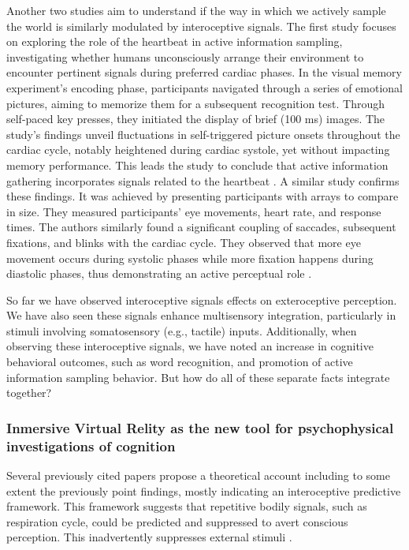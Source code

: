 \documentclass[12pt,oneside,openright]{report}
\begin{document}
Another two studies aim to understand if the way in which we actively sample the world is similarly modulated by interoceptive signals. The first study focuses on exploring the role of the heartbeat in active information sampling, investigating whether humans unconsciously arrange their environment to encounter pertinent signals during preferred cardiac phases. In the visual memory experiment's encoding phase, participants navigated through a series of emotional pictures, aiming to memorize them for a subsequent recognition test. Through self-paced key presses, they initiated the display of brief (100 ms) images. The study's findings unveil fluctuations in self-triggered picture onsets throughout the cardiac cycle, notably heightened during cardiac systole, yet without impacting memory performance. This leads the study to conclude that active information gathering incorporates signals related to the heartbeat \parencite{Kunzendorf2019-vz}. A similar study confirms these findings. It was achieved by presenting participants with arrays to compare in size. They measured participants' eye movements, heart rate, and response times. The authors similarly found a significant coupling of saccades, subsequent fixations, and blinks with the cardiac cycle. They observed that more eye movement occurs during systolic phases while more fixation happens during diastolic phases, thus demonstrating an active perceptual role \parencite{GalvezPol2018ActiveSI}.

So far we have observed interoceptive signals effects on exteroceptive perception. We have also seen these signals enhance multisensory integration, particularly in stimuli involving somatosensory (e.g., tactile) inputs. Additionally, when observing these interoceptive signals, we have noted an increase in cognitive behavioral outcomes, such as word recognition, and promotion of active information sampling behavior. But how do all of these separate facts integrate together?

\subsubsection*{Inmersive Virtual Relity as the new tool for psychophysical investigations of cognition}

Several previously cited papers propose a theoretical account including to some extent the previously point findings, mostly indicating an interoceptive predictive framework. This framework suggests that repetitive bodily signals, such as respiration cycle, could be predicted and suppressed to avert conscious perception. This inadvertently suppresses external stimuli \parencite{AL2021118247, SALTAFOSSI2023108642, Allen2022}.
\end{document}
